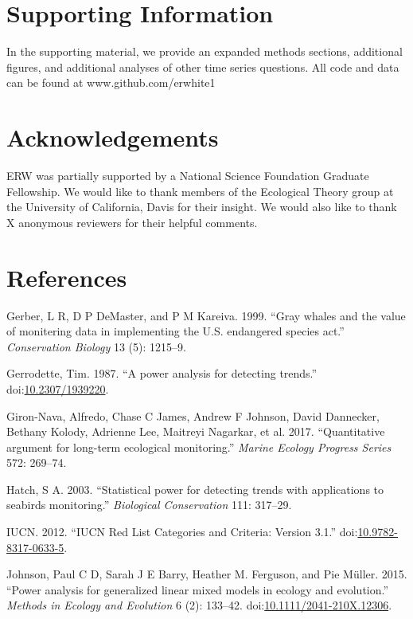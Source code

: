 \documentclass[12pt,]{article}
\begin{document}
\section{Supporting Information}\label{supporting-information}

In the supporting material, we provide an expanded methods sections,
additional figures, and additional analyses of other time series
questions. All code and data can be found at www.github.com/erwhite1

\section{Acknowledgements}\label{acknowledgements}

ERW was partially supported by a National Science Foundation Graduate
Fellowship. We would like to thank members of the Ecological Theory
group at the University of California, Davis for their insight. We would
also like to thank X anonymous reviewers for their helpful comments.

\section{References}\label{references}

\hypertarget{refs}{}
\hypertarget{ref-Gerber1999}{}
Gerber, L R, D P DeMaster, and P M Kareiva. 1999. ``Gray whales and the
value of monitering data in implementing the U.S. endangered species
act.'' \emph{Conservation Biology} 13 (5): 1215--9.

\hypertarget{ref-Gerrodette1987}{}
Gerrodette, Tim. 1987. ``A power analysis for detecting trends.''
doi:\href{https://doi.org/10.2307/1939220}{10.2307/1939220}.

\hypertarget{ref-Giron-Nava2017}{}
Giron-Nava, Alfredo, Chase C James, Andrew F Johnson, David Dannecker,
Bethany Kolody, Adrienne Lee, Maitreyi Nagarkar, et al. 2017.
``Quantitative argument for long-term ecological monitoring.''
\emph{Marine Ecology Progress Series} 572: 269--74.

\hypertarget{ref-Hatch2003}{}
Hatch, S A. 2003. ``Statistical power for detecting trends with
applications to seabirds monitoring.'' \emph{Biological Conservation}
111: 317--29.

\hypertarget{ref-IUCN2012}{}
IUCN. 2012. ``IUCN Red List Categories and Criteria: Version 3.1.''
doi:\href{https://doi.org/10.9782-8317-0633-5}{10.9782-8317-0633-5}.

\hypertarget{ref-Johnson2015}{}
Johnson, Paul C D, Sarah J E Barry, Heather M. Ferguson, and Pie Müller.
2015. ``Power analysis for generalized linear mixed models in ecology
and evolution.'' \emph{Methods in Ecology and Evolution} 6 (2): 133--42.
doi:\href{https://doi.org/10.1111/2041-210X.12306}{10.1111/2041-210X.12306}.
\end{document}
